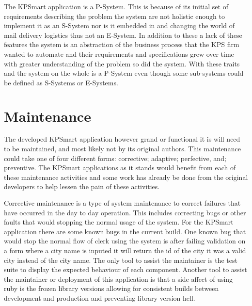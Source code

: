 \documentclass{style/CRPITStyle}
\begin{document}
\vspace{.1in}

The KPSmart application is a P-System. This is because of its initial set of
requirements describing the problem the system are not holistic enough to
implement it as an S-System nor is it embedded in and changing the world of mail
delivery logistics thus not an E-System. In addition to these a lack of
these features the system is an abstraction of the business process that the
KPS firm wanted to automate and their requirements and specifications grew over
time with greater understanding of the problem so did the system. With these
traits and the system on the whole is a P-System even though some sub-systems
could be defined as S-Systems or E-Systems.

\section{Maintenance}
%
%
%

The developed KPSmart application however grand or functional it is will need
to be maintained, and most likely not by its original authors. This maintenance
could take one of four different forms: corrective; adaptive; perfective, and;
preventive. The KPSmart applications as it stands would benefit from each of
these maintenance activities and some work has already be done from the original
developers to help lessen the pain of these activities.

\vspace{.1in}

Corrective maintenance is a type of system maintenance to correct failures that
have occurred in the day to day operation. This includes correcting bugs or
other faults that would stopping the normal usage of the system. 
For the KPSmart application there are some known bugs in the current build. 
One known bug that would stop the normal flow of clerk using the system is after
failing validation on a form where a city name is inputed it will return the id
of the city it was a valid city instead of the city name. The only tool to
assist the maintainer is the test suite to display the expected behaviour of
each component. Another tool to assist the maintainer or deployment of this
application is that a side affect of using ruby is the frozen library versions
allowing for consistent builds between development and production and preventing
library version hell.
\end{document}
